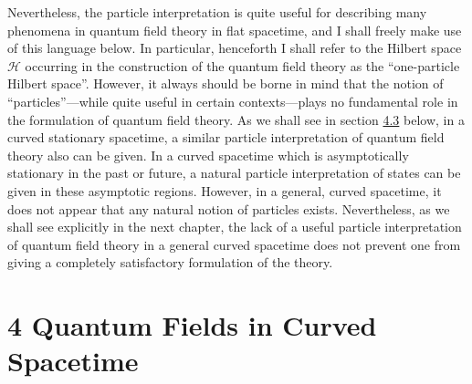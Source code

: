 \documentclass[11pt,a4paper]{article}
\begin{document}
Nevertheless, the particle interpretation is quite useful for describing many phenomena in quantum field theory in flat spacetime, and I shall freely make use of this language below. In particular, henceforth I shall refer to the Hilbert space \(\mathcal{H}\) occurring in the construction of the quantum field theory as the ``one-particle Hilbert space''. However, it always should be borne in mind that the notion of ``particles''---while quite useful in certain contexts---plays no fundamental role in the formulation of quantum field theory. As we shall see in section \hyperlink{sec:4.3}{4.3} below, in a curved stationary spacetime, a similar particle interpretation of quantum field theory also can be given. In a curved spacetime which is asymptotically stationary in \hypertarget{source-65}{} the past or future, a natural particle interpretation of states can be given in these asymptotic regions. However, in a general, curved spacetime, it does not appear that any natural notion of particles exists. Nevertheless, as we shall see explicitly in the next chapter, the lack of a useful particle interpretation of quantum field theory in a general curved spacetime does not prevent one from giving a completely satisfactory formulation of the theory.

\clearpage
\hypertarget{source-66}{}
\section*{4 Quantum Fields in Curved Spacetime}\hypertarget{sec:4}{}
\end{document}
